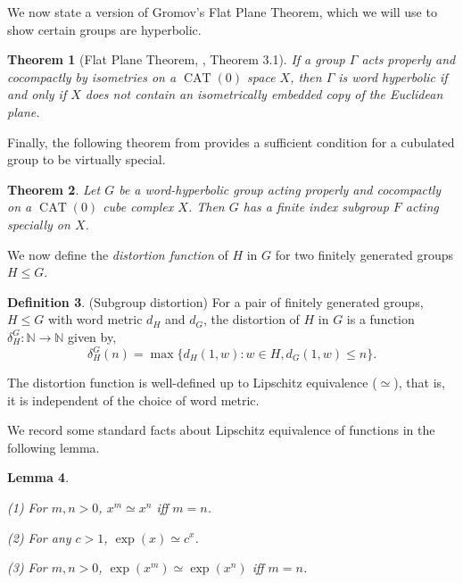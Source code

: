 \documentclass[oneside,11pt,reqno]{amsart}
\newtheorem{thm}{Theorem}[section]
\newtheorem{lem}[thm]{Lemma}
\theoremstyle{definition}
\newtheorem{defn}[thm]{Definition}
\DeclareMathOperator{\CAT}{CAT}
\begin{document}
We now state a version of Gromov's Flat Plane Theorem, which we will use to show certain groups are hyperbolic.

\begin{thm}[Flat Plane Theorem, \cite{bridh}, Theorem 3.1]\label{flt} If a group $\Gamma$ acts properly and cocompactly by isometries on a $\CAT(0)$ space $X$, then $\Gamma$ is word hyperbolic if and only if $X$ does not contain an isometrically embedded copy of the Euclidean plane.
    
\end{thm} 

Finally, the following theorem from \cite{Agol} provides a sufficient condition for a cubulated group to be virtually special.

\begin{thm}\cite[Theroem 1.1]{Agol}\label{Agol's theorem}
    Let $G$ be a word-hyperbolic group acting properly and cocompactly on a $\CAT(0)$ cube complex $X$. Then $G$ has a finite index subgroup $F$ acting specially on $X$. 
\end{thm}



We now define the \emph{distortion function} of $H$ in $G$ for two finitely generated groups $H \leq G$.
\begin{defn}\label{dist}(Subgroup distortion)
For a pair of finitely generated groups, $H \leq G$ with word metric $d_H$ and $d_G$, the distortion of $H$ in $G$ is a function $\delta_H^G: \mathbb{N}  \longrightarrow \mathbb{N}$ given by, 
    $$\delta_H^G(n)= \max \{ d_H(1, w):  w \in H, d_G(1, w) \leq n\}.$$
\end{defn}
The distortion function is well-defined up to Lipschitz equivalence ($\simeq$), that is, it is independent of the choice of word metric.

We record some standard facts about Lipschitz equivalence of functions in the following lemma.

\begin{lem}\label{disteq}

(1) For $m ,n > 0$, $x^m \simeq x^n$ iff $m=n$.

(2) For any $c > 1$, $\exp(x) \simeq c^x$.

(3) For $m, n > 0$, $\exp(x^m) \simeq \exp(x^n)$ iff $m=n$.
\end{lem}


    
\end{document}
